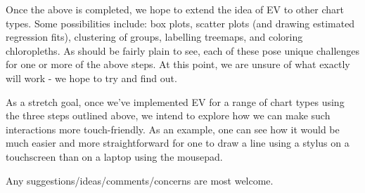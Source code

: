 \documentclass[paper=a4, fontsize=11pt]{article} %
\begin{document}
Once the above is completed, we hope to extend the idea of EV to other chart types. Some possibilities include: box plots, scatter plots (and drawing estimated regression fits), clustering of groups, labelling treemaps, and coloring chloropleths. As should be fairly plain to see, each of these pose unique challenges for one or more of the above steps. At this point, we are unsure of what exactly will work - we hope to try and find out.

As a stretch goal, once we've implemented EV for a range of chart types using the three steps outlined above, we intend to explore how we can make such interactions more touch-friendly. As an example, one can see how it would be much easier and more straightforward for one to draw a line using a stylus on a touchscreen than on a laptop using the mousepad.

Any suggestions/ideas/comments/concerns are most welcome.
\end{document}
